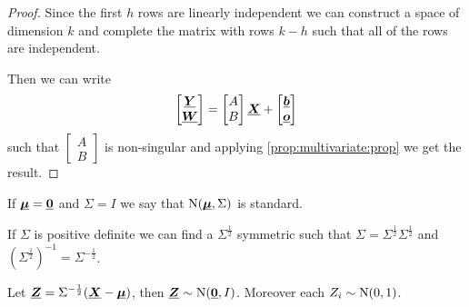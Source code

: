 \documentclass[12pt]{extarticle}
\newcommand{\Normal}{{\operatorfont N}}
\renewcommand{\vec}[1]{\uvec{#1}}
\begin{document}
\begin{proof}
    Since the first $h$ rows are linearly independent we can construct a space of dimension $k$ and complete the matrix with rows $k-h$ such that all of the rows are independent.

    Then we can write
    \begin{equation}
        \begin{bmatrix}
            \vec Y \\ \vec W
        \end{bmatrix} =
        \begin{bmatrix}
            A \\ B
        \end{bmatrix} \vec X +
        \begin{bmatrix}
            \vec b \\ \vec o
        \end{bmatrix}
    \end{equation}
    such that $\begin{bmatrix}
            A \\ B
        \end{bmatrix}$ is non-singular and applying \autoref{prop:multivariate:prop} we get the result.
\end{proof}

\begin{definition}
    If $\vec \mu = \vec 0$ and $\Sigma = I$ we say that $\Normal(\vec \mu, \Sigma)$ is standard.
\end{definition}

\begin{proposition}[standardizing]
    If $\Sigma$ is positive definite we can find a $\Sigma^{\frac{1}{2}}$ symmetric such that $\Sigma = \Sigma^{\frac{1}{2}} \Sigma^{\frac{1}{2}}$ and $\left(\Sigma^{\frac{1}{2}}\right)^{-1} = \Sigma^{-\frac{1}{2}}$.

    Let $\vec Z = \Sigma^{-\frac{1}{2}} (\vec X -\vec \mu)$, then $\vec Z \sim \Normal(\vec 0, I)$.
    Moreover each $Z_i \sim \Normal(0, 1)$.
\end{proposition}
\end{document}
